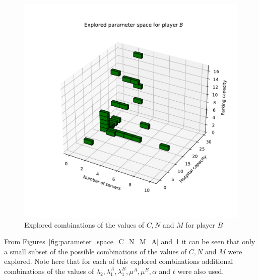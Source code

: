 \begin{figure}[H]
    \centering
    \includegraphics[width=\linewidth]{chapters/05_numerical_results/Bin/explored_parameters_2.pdf}
    \caption{Explored combinations of the values of \(C, N\) and \(M\) for
    player \(B\)}
    \label{fig:parameter_space_C_N_M_B}
\end{figure}

From Figures~\ref{fig:parameter_space_C_N_M_A}
and~\ref{fig:parameter_space_C_N_M_B} it can be seen that only a small subset
of the possible combinations of the values of \(C, N\) and \(M\) were explored.
Note here that for each of this explored combinations additional combinations
of the values of \(\lambda_2, \lambda_1^A, \lambda_1^B, \mu^A, \mu^B, \alpha\)
and \(t\) were also used.

